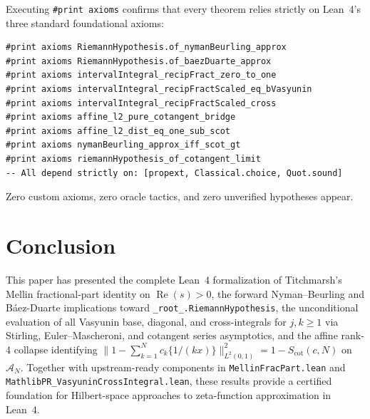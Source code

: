 \documentclass[11pt,a4paper]{article}
\theoremstyle{definition}
\begin{document}
Executing \texttt{\#print axioms} confirms that every theorem relies strictly on Lean~4's three standard foundational axioms:
\begin{lstlisting}
#print axioms RiemannHypothesis.of_nymanBeurling_approx
#print axioms RiemannHypothesis.of_baezDuarte_approx
#print axioms intervalIntegral_recipFract_zero_to_one
#print axioms intervalIntegral_recipFractScaled_eq_bVasyunin
#print axioms intervalIntegral_recipFractScaled_cross
#print axioms affine_l2_pure_cotangent_bridge
#print axioms affine_l2_dist_eq_one_sub_scot
#print axioms nymanBeurling_approx_iff_scot_gt
#print axioms riemannHypothesis_of_cotangent_limit
-- All depend strictly on: [propext, Classical.choice, Quot.sound]
\end{lstlisting}
Zero custom axioms, zero oracle tactics, and zero unverified hypotheses appear.

\section{Conclusion}

This paper has presented the complete Lean~4 formalization of Titchmarsh's Mellin fractional-part identity on $\operatorname{Re}(s) > 0$, the forward Nyman--Beurling and B\'aez-Duarte implications toward \texttt{\_root\_.RiemannHypothesis}, the unconditional evaluation of all Vasyunin base, diagonal, and cross-integrals for $j, k \ge 1$ via Stirling, Euler--Mascheroni, and cotangent series asymptotics, and the affine rank-4 collapse identifying $\|1 - \sum_{k=1}^N c_k \{1/(kx)\}\|_{L^2(0,1)}^2 = 1 - S_{\mathrm{cot}}(c, N)$ on $\mathcal{A}_N$. Together with upstream-ready components in \texttt{MellinFracPart.lean} and \texttt{MathlibPR\_\allowbreak VasyuninCrossIntegral.lean}, these results provide a certified foundation for Hilbert-space approaches to zeta-function approximation in Lean~4.
\end{document}
